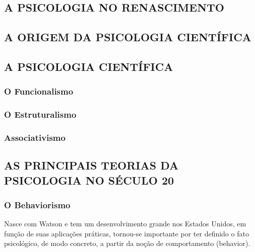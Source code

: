 \documentclass[
]{book}
\theoremstyle{definition}
\theoremstyle{definition}
\theoremstyle{definition}
\theoremstyle{definition}
\theoremstyle{remark}
\begin{document}
\hypertarget{a-psicologia-no-renascimento}{%
\subsection{A PSICOLOGIA NO RENASCIMENTO}\label{a-psicologia-no-renascimento}}

\hypertarget{a-origem-da-psicologia-cientuxedfica}{%
\subsection{A ORIGEM DA PSICOLOGIA CIENTÍFICA}\label{a-origem-da-psicologia-cientuxedfica}}

\hypertarget{a-psicologia-cientuxedfica}{%
\subsection{A PSICOLOGIA CIENTÍFICA}\label{a-psicologia-cientuxedfica}}

\hypertarget{o-funcionalismo}{%
\subsubsection{O Funcionalismo}\label{o-funcionalismo}}

\hypertarget{o-estruturalismo}{%
\subsubsection{O Estruturalismo}\label{o-estruturalismo}}

\hypertarget{associativismo}{%
\subsubsection{Associativismo}\label{associativismo}}

\hypertarget{as-principais-teorias-da-psicologia-no-suxe9culo-20}{%
\subsection{AS PRINCIPAIS TEORIAS DA PSICOLOGIA NO SÉCULO 20}\label{as-principais-teorias-da-psicologia-no-suxe9culo-20}}

\hypertarget{o-behaviorismo}{%
\subsubsection{O Behaviorismo}\label{o-behaviorismo}}

Nasce com Watson e tem um desenvolvimento grande nos Estados Unidos, em função de suas aplicações práticas, tornou-se importante por ter definido o fato psicológico, de modo concreto, a partir da noção de comportamento (behavior).
\end{document}
